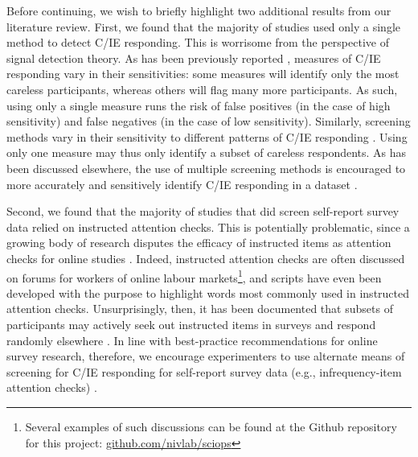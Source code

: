 \documentclass[a4paper,notitlepage,12pt]{article}
\begin{document}

Before continuing, we wish to briefly highlight two additional results from our literature review. First, we found that the majority of studies used only a single method to detect C/IE responding. This is worrisome from the perspective of signal detection theory. As has been previously reported \cite{desimone2018dirty}, measures of C/IE responding vary in their sensitivities: some measures will identify only the most careless participants, whereas others will flag many more participants. As such, using only a single measure runs the risk of false positives (in the case of high sensitivity) and false negatives (in the case of low sensitivity). Similarly, screening methods vary in their sensitivity to different patterns of C/IE responding \cite{curran2016methods}. Using only one measure may thus only identify a subset of careless respondents. As has been discussed elsewhere, the use of multiple screening methods is encouraged to more accurately and sensitively identify C/IE responding in a dataset \cite{curran2016methods, barends2019noncompliant}.

Second, we found that the majority of studies that did screen self-report survey data relied on instructed attention checks. This is potentially problematic, since a growing body of research disputes the efficacy of instructed items as attention checks for online studies \cite{barends2019noncompliant, thomas2017validity, hauser2016attentive}. Indeed, instructed attention checks are often discussed on forums for workers of online labour markets\footnote{Several examples of such discussions can be found at the Github repository for this project: \url{github.com/nivlab/sciops}}, and scripts have even been developed with the purpose to highlight words most commonly used in instructed attention checks. Unsurprisingly, then, it has been documented that subsets of participants may actively seek out instructed items in surveys and respond randomly elsewhere \cite{barends2019noncompliant}. In line with best-practice recommendations for online survey research, therefore, we encourage experimenters to use alternate means of screening for C/IE responding for self-report survey data (e.g., infrequency-item attention checks) \cite{huang2015detecting}.
\end{document}
